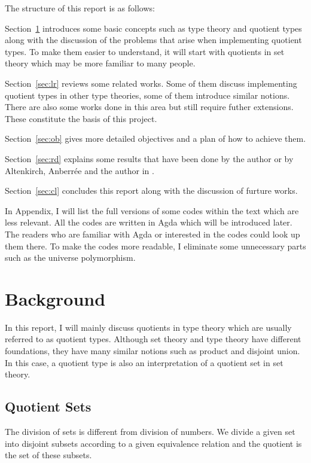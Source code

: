 \documentclass{article}
\theoremstyle{definition}
\begin{document}
The structure of this report is as follows:

Section~\ref{sec:bg} introduces some basic concepts such as type
theory and quotient types along with the discussion of the problems
that arise when implementing quotient types. To make them easier to understand, it
will start with quotients in set theory which may be
more familiar to many people. 

Section~\ref{sec:lr} reviews some related works. Some of them discuss
implementing quotient types in other type theories, some of them
introduce similar notions. There are also some works done in this area
but still require futher extensions. These constitute the basis of this project.

Section~\ref{sec:ob} gives more detailed objectives and a plan of how
to achieve them.

Section~\ref{sec:rd} explains some results that have been done by the
author or by Altenkirch, Anberr\'{e}e and the author in \cite{aan}.

Section~\ref{sec:cl} concludes this report along with the discussion
of furture works.

In Appendix, I will list the full versions of some codes within the
text which are less relevant. All the codes are written in Agda which
will be introduced later. The readers who are familiar with Agda
or interested in the codes could look up them there. To make the codes
more readable, I eliminate some unnecessary parts such as the universe polymorphism.

\section{Background}
\label{sec:bg}

In this report, I will mainly discuss quotients in type theory
which are usually referred to as quotient types. Although set theory and
type theory have different foundations, they have many similar
notions such as product and disjoint union.  In this case, a quotient type
is also an interpretation of a quotient set in set theory.

\subsection{Quotient Sets} 

The division of sets is different from division of numbers. We divide a
given set into disjoint subsets according to a given equivalence relation
and the quotient is the set of these subsets.
\end{document}
